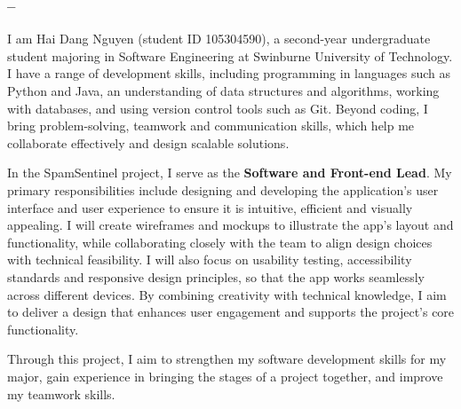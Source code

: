 \subsubsection{\memberThree{} -- \memberThreeDiscipline}
{I am Hai Dang Nguyen (student ID 105304590), a second-year undergraduate student majoring in Software Engineering at Swinburne University of Technology. I have a range of development skills, including programming in languages such as Python and Java, an understanding of data structures and algorithms, working with databases, and using version control tools such as Git. Beyond coding, I bring problem-solving, teamwork and communication skills, which help me collaborate effectively and design scalable solutions.

In the SpamSentinel project, I serve as the \textbf{Software and Front-end Lead}. My primary responsibilities include designing and developing the application's user interface and user experience to ensure it is intuitive, efficient and visually appealing. I will create wireframes and mockups to illustrate the app's layout and functionality, while collaborating closely with the team to align design choices with technical feasibility. I will also focus on usability testing, accessibility standards and responsive design principles, so that the app works seamlessly across different devices. By combining creativity with technical knowledge, I aim to deliver a design that enhances user engagement and supports the project's core functionality.

Through this project, I aim to strengthen my software development skills for my major, gain experience in bringing the stages of a project together, and improve my teamwork skills.}
